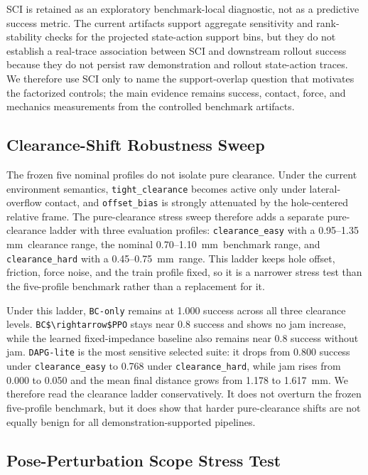 ﻿\documentclass[11pt]{article}
\newcommand{\code}[1]{\nolinkurl{#1}}
\newcommand{\mm}{\ensuremath{\mathrm{mm}}}
\begin{document}
SCI is retained as an exploratory benchmark-local diagnostic, not as a predictive success metric.
The current artifacts support aggregate sensitivity and rank-stability checks for the projected
state-action support bins, but they do not establish a real-trace association between SCI and
downstream rollout success because they do not persist raw demonstration and rollout state-action traces. We
therefore use SCI only to name the support-overlap question that motivates the factorized controls;
the main evidence remains success, contact, force, and mechanics measurements from the controlled
benchmark artifacts.

\subsection{Clearance-Shift Robustness Sweep}

The frozen five nominal profiles do not isolate pure clearance. Under the current environment
semantics, \code{tight\_clearance} becomes active only under lateral-overflow contact, and
\code{offset\_bias} is strongly attenuated by the hole-centered relative frame. The pure-clearance stress sweep therefore
adds a separate pure-clearance ladder with three evaluation profiles:
\code{clearance\_easy} with a 0.95--1.35~\mm\ clearance range, the nominal 0.70--1.10~\mm\
benchmark range, and \code{clearance\_hard} with a 0.45--0.75~\mm\ range. This ladder keeps hole
offset, friction, force noise, and the train profile fixed, so it is a narrower stress test than
the five-profile benchmark rather than a replacement for it.

Under this ladder, \code{BC-only} remains at 1.000 success across all three clearance levels.
\code{BC$\rightarrow$PPO} stays near 0.8 success and shows no jam increase, while the learned
fixed-impedance baseline also remains near 0.8 success without jam. \code{DAPG-lite} is the most
sensitive selected suite: it drops from 0.800 success under \code{clearance\_easy} to 0.768 under
\code{clearance\_hard}, while jam rises from 0.000 to 0.050 and the mean final distance grows from
1.178 to 1.617~\mm. We therefore read the clearance ladder conservatively. It does not overturn
the frozen five-profile benchmark, but it does show that harder pure-clearance shifts are not
equally benign for all demonstration-supported pipelines.

\subsection{Pose-Perturbation Scope Stress Test}
\end{document}
